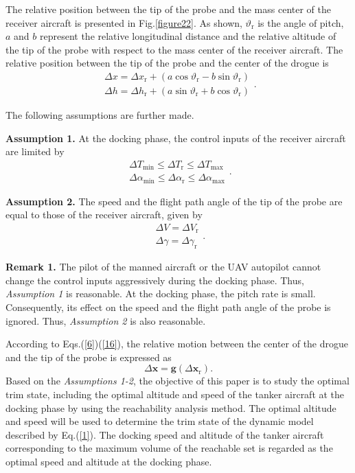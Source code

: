 The relative position between the tip of the probe and the mass center of
the receiver aircraft is presented in Fig.\ref{figure22}. As shown, $%
\vartheta _\text{r}$ is the angle of pitch, $a$ and $b$ represent the relative
longitudinal distance and the relative altitude of the tip of the probe with
respect to the mass center of the receiver aircraft. The relative position
between the tip of the probe and the center of the drogue is%
\begin{equation}
\begin{array}{c}
\Delta x=\Delta x_\text{r}+(a\cos \vartheta_\text{r}-b\sin \vartheta_\text{r}) \\
\Delta h=\Delta h_\text{r}+(a\sin \vartheta_\text{r}+b\cos \vartheta_\text{r})%
\end{array}
.  \label{6}
\end{equation}

The following assumptions are further made.

\textbf{Assumption 1.} At the docking phase, the control inputs of the
receiver aircraft are limited by%
\begin{equation}
\begin{array}{c}
\Delta T_{\min}\leq \Delta T_\text{r}\leq \Delta T_{\max} \\
\Delta \alpha_{\min}\leq \Delta \alpha_\text{r}\leq \Delta \alpha_{\max}%
\end{array}
.  \label{7}
\end{equation}

\textbf{Assumption 2. }The speed and the flight path angle of the tip of the
probe are equal to those of the receiver aircraft, given by%
\begin{equation}
\begin{array}{c}
\Delta V=\Delta V_\text{r} \\
\Delta \gamma=\Delta \gamma_\text{r}%
\end{array}
.  \label{16}
\end{equation}

\textbf{Remark 1. }The pilot of the manned aircraft or the UAV autopilot
cannot change the control inputs aggressively during the docking phase.
Thus, \textit{Assumption 1} is reasonable. At the docking phase, the pitch
rate is small. Consequently, its effect on the speed and the flight path
angle of the probe is ignored. Thus, \textit{Assumption 2} is also
reasonable.

According to Eqs.(\ref{6})(\ref{16}), the relative motion between the center
of the drogue and the tip of the probe is expressed as%
\begin{equation}
\Delta \mathbf{x}=\mathbf{g}(\Delta \mathbf{x}_\text{r}).  \label{outputeq}
\end{equation}
Based on the \textit{Assumptions 1-2}, the objective of this paper is to
study the optimal trim state, including the optimal altitude and speed of
the tanker aircraft at the docking phase by using the reachability analysis
method. The optimal altitude and speed will be used to determine the trim
state of the dynamic model described by Eq.(\ref{1}). The docking speed and
altitude of the tanker aircraft corresponding to the maximum volume of the
reachable set is regarded as the optimal speed and altitude at the docking
phase.

